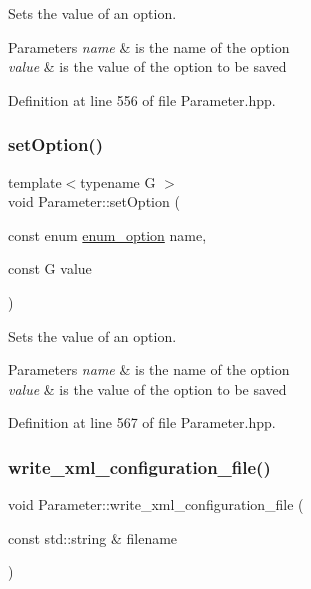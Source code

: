 Sets the value of an option. 


\begin{DoxyParams}{Parameters}
{\em name} & is the name of the option \\
\hline
{\em value} & is the value of the option to be saved \\
\hline
\end{DoxyParams}


Definition at line 556 of file Parameter.\+hpp.

\mbox{\label{classParameter_a30da48555011134a7df03d0e463ba1fa}} 
\subsubsection{\texorpdfstring{set\+Option()}{setOption()}\hspace{0.1cm}{\footnotesize\ttfamily [3/3]}}
{\footnotesize\ttfamily template$<$typename G $>$ \\
void Parameter\+::set\+Option (\begin{DoxyParamCaption}\item[{const enum \hyperlink{Parameter_8hpp_a6d9441db52e537f5588658b218875976}{enum\+\_\+option}}]{name,  }\item[{const G}]{value }\end{DoxyParamCaption})\hspace{0.3cm}{\ttfamily [inline]}}



Sets the value of an option. 


\begin{DoxyParams}{Parameters}
{\em name} & is the name of the option \\
\hline
{\em value} & is the value of the option to be saved \\
\hline
\end{DoxyParams}


Definition at line 567 of file Parameter.\+hpp.

\mbox{\label{classParameter_aad809169029074f9f29fb1c7d380be03}} 
\subsubsection{\texorpdfstring{write\+\_\+xml\+\_\+configuration\+\_\+file()}{write\_xml\_configuration\_file()}}
{\footnotesize\ttfamily void Parameter\+::write\+\_\+xml\+\_\+configuration\+\_\+file (\begin{DoxyParamCaption}\item[{const std\+::string \&}]{filename }\end{DoxyParamCaption})}



